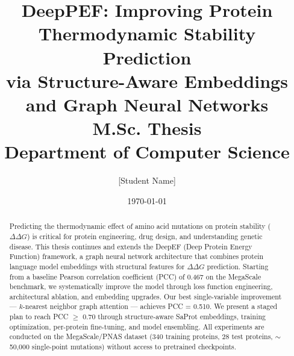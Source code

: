 \documentclass[12pt,a4paper]{report}
\title{
    \textbf{DeepPEF: Improving Protein Thermodynamic Stability Prediction\\via Structure-Aware Embeddings and Graph Neural Networks}\\[1cm]
    \large M.Sc. Thesis\\
    \large Department of Computer Science
}
\author{[Student Name]}
\date{\today}
\begin{document}
\maketitle

\begin{abstract}
Predicting the thermodynamic effect of amino acid mutations on protein stability ($\Delta\Delta G$) is critical for protein engineering, drug design, and understanding genetic disease. This thesis continues and extends the DeepEF (Deep Protein Energy Function) framework, a graph neural network architecture that combines protein language model embeddings with structural features for $\Delta\Delta G$ prediction. Starting from a baseline Pearson correlation coefficient (PCC) of 0.467 on the MegaScale benchmark, we systematically improve the model through loss function engineering, architectural ablation, and embedding upgrades. Our best single-variable improvement --- $k$-nearest neighbor graph attention --- achieves PCC = 0.510. We present a staged plan to reach PCC $\geq$ 0.70 through structure-aware SaProt embeddings, training optimization, per-protein fine-tuning, and model ensembling. All experiments are conducted on the MegaScale/PNAS dataset (340 training proteins, 28 test proteins, $\sim$50,000 single-point mutations) without access to pretrained checkpoints.
\end{abstract}

\tableofcontents










\end{document}
